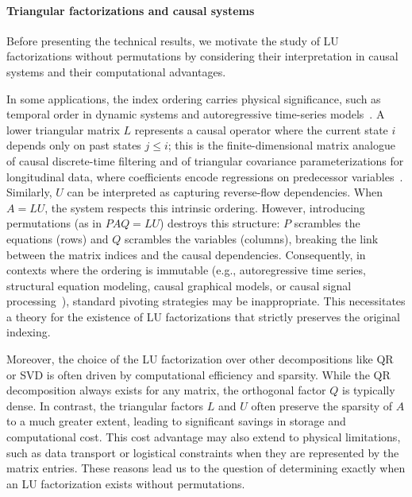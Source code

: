 \documentclass[10pt,twoside]{siamart1116}
\numberwithin{theorem}{section}
\begin{document}
\paragraph{Triangular factorizations and causal systems} Before presenting the technical results, we motivate the study of LU factorizations without permutations by considering their interpretation in causal systems and their computational advantages.

In some applications, the index ordering carries physical significance, such as temporal order in dynamic systems and autoregressive time-series models~\cite{hamilton_time_1994,granger_investigating_1969}. A lower triangular matrix $L$ represents a causal operator where the current state $i$ depends only on past states $j \le i$; this is the finite-dimensional matrix analogue of causal discrete-time filtering and of triangular covariance parameterizations for longitudinal data, where coefficients encode regressions on predecessor variables~\cite{oppenheim_discrete_2010,pourahmadi_joint_1999}. Similarly, $U$ can be interpreted as capturing reverse-flow dependencies. When $A=LU$, the system respects this intrinsic ordering. However, introducing permutations (as in $PAQ = LU$) destroys this structure: $P$ scrambles the equations (rows) and $Q$ scrambles the variables (columns), breaking the link between the matrix indices and the causal dependencies. Consequently, in contexts where the ordering is immutable (e.g., autoregressive time series, structural equation modeling, causal graphical models, or causal signal processing~\cite{bollen_structural_1989,pearl_causality_2009,peters_elements_2017}), standard pivoting strategies may be inappropriate. This necessitates a theory for the existence of LU factorizations that strictly preserves the original indexing.

Moreover, the choice of the LU factorization over other decompositions like QR or SVD is often driven by computational efficiency and sparsity. While the QR decomposition always exists for any matrix, the orthogonal factor $Q$ is typically dense. In contrast, the triangular factors $L$ and $U$ often preserve the sparsity of $A$ to a much greater extent, leading to significant savings in storage and computational cost. This cost advantage may also extend to physical limitations, such as data transport or logistical constraints when they are represented by the matrix entries. These reasons lead us to the question of determining exactly when an LU factorization exists without permutations.
\end{document}
